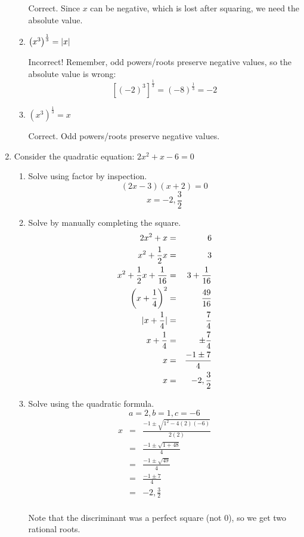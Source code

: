 \documentclass[letterpaper,12pt,fleqn]{article}
\begin{document}
\begin{enumerate}
\begin{enumerate}
  Correct. Since $x$ can be negative, which is lost after squaring, we need the
  absolute value.
  
\item $\left(x^3\right)^{\frac{1}{3}}=\lvert x\rvert$
  
  Incorrect! Remember, odd powers/roots preserve negative values, so the
  absolute value is wrong:
  \[[(-2)^3]^{\frac{1}{3}}=(-8)^{\frac{1}{3}}=-2\]
  
\item $\left(x^3\right)^{\frac{1}{3}}=x$

  Correct. Odd powers/roots preserve negative values.
\end{enumerate}

\item Consider the quadratic equation: $2x^2+x-6=0$
  \begin{enumerate}
  \item Solve using factor by inspection.
    \[(2x-3)(x+2)=0\]
    \[x=-2,\frac{3}{2}\]
  \item Solve by manually completing the square.
    \begin{eqnarray*}
      2x^2+x &=& 6 \\
      x^2+\frac{1}{2}x &=& 3 \\
      x^2+\frac{1}{2}x+\frac{1}{16} &=& 3+\frac{1}{16} \\
      \left(x+\frac{1}{4}\right)^2 &=& \frac{49}{16} \\
      \lvert x+\frac{1}{4}\rvert &=& \frac{7}{4} \\
      x+\frac{1}{4} &=& \pm\frac{7}{4} \\
      x &=& \frac{-1\pm7}{4} \\
      x &=& -2,\frac{3}{2} \\
    \end{eqnarray*}
  \item Solve using the quadratic formula.
    \[a=2, b=1, c=-6\]
    \begin{eqnarray*}
      x &=& \frac{-1\pm\sqrt{1^2-4(2)(-6)}}{2(2)} \\
      &=& \frac{-1\pm\sqrt{1+48}}{4} \\
      &=& \frac{-1\pm\sqrt{49}}{4} \\
      &=& \frac{-1\pm7}{4} \\
      &=& -2,\frac{3}{2} \\
    \end{eqnarray*}

    Note that the discriminant was a perfect square (not 0), so we get two
    rational roots.
    

\end{enumerate}
\end{enumerate}
\end{document}
